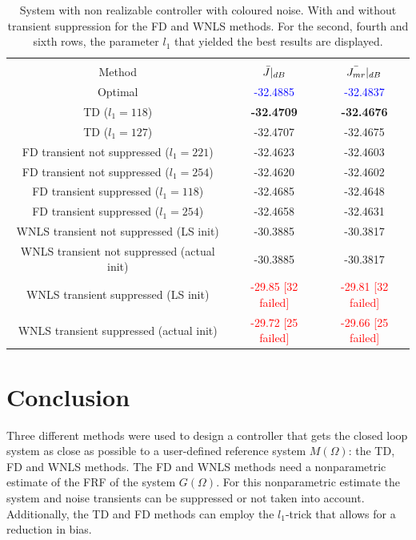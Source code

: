 \begin{table}[H]
\centering
\begin{tabular}{|ccc|}
\hline
&&\\[-2.5ex]
Method & $\Bar{J}|_{dB}$ & $\Bar{J_{mr}}|_{dB}$ \\
\hline
Optimal                                     & \textcolor{blue}{-32.4885} & \textcolor{blue}{-32.4837} \\
TD ($l_1 = 118$)                               & \textbf{-32.4709} & \textbf{-32.4676} \\
TD ($l_1 = 127$)                            & -32.4707 & -32.4675 \\
FD transient not suppressed ($l_1 = 221$)      & -32.4623 & -32.4603 \\
FD transient not suppressed ($l_1 = 254$)   & -32.4620 & -32.4602 \\
FD transient suppressed ($l_1 = 118$)          & -32.4685 & -32.4648 \\
FD transient suppressed ($l_1 = 254$)       & -32.4658 & -32.4631 \\
WNLS transient not suppressed (LS init)     & -30.3885 & -30.3817 \\
WNLS transient not suppressed (actual init) & -30.3885 & -30.3817 \\
WNLS transient suppressed (LS init)         & \textcolor{red}{-29.85 [32 failed]}      & \textcolor{red}{-29.81 [32 failed]}       \\
WNLS transient suppressed (actual init)     & \textcolor{red}{-29.72 [25 failed]}       & \textcolor{red}{-29.66 [25 failed]}       \\
\hline
\end{tabular}
\caption{System with non realizable controller with coloured noise. With and without transient suppression for the FD and WNLS methods. For the second, fourth and sixth rows, the parameter $l_1$ that yielded the best results are displayed.}
\label{tab:non_realizable_coloured_transient_with_without_TD_vs_FD_vs_WNLS}
\end{table}


\newpage
\section{Conclusion}
Three different methods were used to design a controller that gets the closed loop system as close as possible to a user-defined reference system $M(\Omega)$: the TD, FD and WNLS methods. The FD and WNLS methods need a nonparametric estimate of the FRF of the system $G(\Omega)$. For this nonparametric estimate the system and noise transients can be suppressed or not taken into account. Additionally, the TD and FD methods can employ the $l_1$-trick that allows for a reduction in bias.

